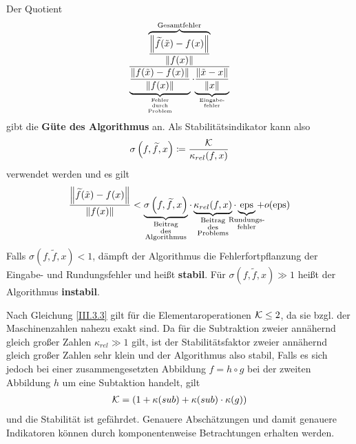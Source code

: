 \begin{Beme}[Sprechweise]\label{3.3.8}
  Der Quotient 
  \begin{gather}
    \frac{\overbrace{\frac{\nn[\widetilde{f}(\tilde{x})-f(x)]}{\nn[f(x)]}}^{
        \text{Gesamtfehler}}}
    {\underbrace{\frac{\nn[f(\tilde{x})-f(x)]}{\nn[f(x)]}}_{
        \scriptsize\substack{
          \text{Fehler} \\
          \text{durch} \\
          \text{Problem}
        }}
      \cdot
      {\underbrace{\frac{\nn[\tilde{x}-x]}{\nn[x]}}_{
          \scriptsize\substack{\text{Eingabe-} \\ \text{fehler}}}}}
    \label{III.3.6}
  \end{gather}
  gibt die \textbf{Güte des Algorithmus}  an.
  Als Stabilitätsindikator kann also 
  \begin{gather}
    \sigma\left(f, \widetilde{f}, x\right) \coloneqq \frac{\K}{\kappa_{rel}(f, x)}
    \label{III.3.7}
  \end{gather}
  verwendet werden und es gilt
  \begin{gather*}
    \frac{\nn[\widetilde{f}(\tilde{x})-f(x)]}{\nn[f(x)]}
    < \underbrace{\sigma\left( f,\widetilde{f}, x\right) }_{
      \mathclap{\substack{\text{Beitrag}\\
          \text{des} \\
          \text{Algorithmus}}}}
    \cdot \underbrace{\kappa_{rel}(f,x)}_{
      \mathclap{\substack{\text{Beitrag} \\
          \text{des} \\
          \text{Problems}}}}
    \cdot \underbrace{\Eps}_{\mathclap{\substack{\text{Rundungs-}\\\text{fehler}}}}
    + o(\Eps)
  \end{gather*}
  Falls $\sigma( f,\widetilde{f}, x)  < 1$, dämpft der Algorithmus die
  Fehlerfortpflanzung der Eingabe- und Rundungsfehler 
  und heißt \textbf{stabil}.
  Für $\sigma(f,\widetilde{f},x)\gg 1$ heißt der Algorithmus \textbf{instabil}.
\end{Beme}



\begin{Bspe}
  Nach Gleichung \eqref{III.3.3} gilt für die Elementaroperationen
  $\mathcal{K}\leq 2$, da sie bzgl. der Maschinenzahlen nahezu exakt sind.
  Da für die Subtraktion zweier annähernd 
  gleich großer Zahlen $\kappa_{rel}\gg 1$ gilt,
  ist der Stabilitätsfaktor zweier annähernd gleich großer
  Zahlen sehr klein und der Algorithmus also stabil,
  Falls es sich jedoch bei einer zusammengesetzten Abbildung $f=h\circ g$
  bei der zweiten Abbildung $h$ um eine Subtaktion handelt, gilt
  \begin{gather*}
    \mathcal{K} =(1+\kappa(sub)+\kappa(sub)\cdot\kappa(g))
  \end{gather*}
  und die Stabilität ist gefährdet.
  Genauere Abschätzungen und damit genauere Indikatoren
  können durch komponentenweise Betrachtungen erhalten werden.
\end{Bspe}


